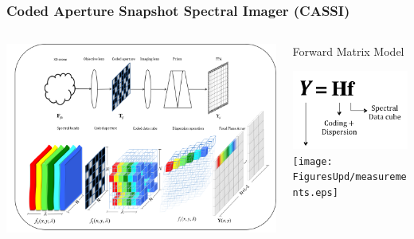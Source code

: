 \documentclass{beamer}
\begin{document}
\begin{frame}
\frametitle{Coded Aperture Snapshot Spectral Imager (CASSI)}
\begin{columns}

\begin{column}{3in}
\begin{center}
\includegraphics[scale=0.28]{FiguresUpd/firstmodelb.png}
\end{center}
\end{column}

\begin{column}{2in}
Forward Matrix Model
\begin{center}
\includegraphics[scale=0.4]{FiguresUpd/Eq3.png}\\
\texttt{[image: FiguresUpd/measurements.eps]}


\end{center}
\end{column}
\end{columns}
\end{frame}
\end{document}
